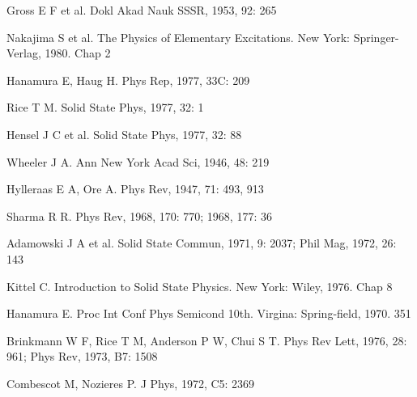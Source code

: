 \begin{canKao}
\begin{enumerate}[label={[\arabic*]}, leftmargin=2.2em, itemsep=0pt]
\item Gross E F et al. Dokl Akad Nauk SSSR, 1953, 92: 265
\item Nakajima S et al. The Physics of Elementary Excitations. New York: Springer-Verlag, 1980. Chap 2
\item Hanamura E, Haug H. Phys Rep, 1977, 33C: 209
\item Rice T M. Solid State Phys, 1977, 32: 1
\item Hensel J C et al. Solid State Phys, 1977, 32: 88
\item Wheeler J A. Ann New York Acad Sci, 1946, 48: 219
\item Hylleraas E A, Ore A. Phys Rev, 1947, 71: 493, 913
\item Sharma R R. Phys Rev, 1968, 170: 770; 1968, 177: 36
\item Adamowski J A et al. Solid State Commun, 1971, 9: 2037; Phil Mag, 1972, 26: 143
\item Kittel C. Introduction to Solid State Physics. New York: Wiley, 1976. Chap 8
\item Hanamura E. Proc Int Conf Phys Semicond 10th. Virgina: Spring-field, 1970. 351
\item Brinkmann W F, Rice T M, Anderson P W, Chui S T. Phys Rev Lett, 1976, 28: 961; Phys Rev, 1973, B7: 1508
\item Combescot M, Nozieres P. J Phys, 1972, C5: 2369
\end{enumerate}
\end{canKao}
